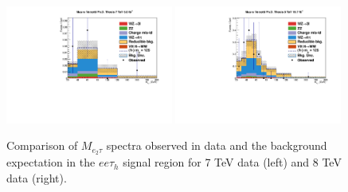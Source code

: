 \begin{figure}
\begin{center}
  \includegraphics[width=0.49\textwidth]{4_Analisys/pics/7TeV/plots/eet/LTCut_7TeV/final-subMass-LTCut_7TeV.pdf}
  \includegraphics[width=0.49\textwidth]{4_Analisys/pics/8TeV/plots/eet/LTCut_8TeV/final-subMass-LTCut_8TeV.pdf}\\
  \caption{
  Comparison of $M_{e_2\tau}$ spectra observed in data and the background expectation %
  in the $ee\tau_h$ signal region for 7 TeV data (left) and 8 TeV data (right).
  }
  \label{fig:LLT_eet_prefit}
\end{center}
\end{figure}


\begin{table}
\caption{Expected event yields for the different background processes and for a 125 GeV WH, $\rm{H}\To\tau\tau$ signal compared to the number of events observed in the data, split by channel and category, for 8 TeV data. The uncertainty quoted on each background process represents statistical plus systematic uncertainty.
}

\label{tab:prefit_yields_table_8TeV}
\end{table}

